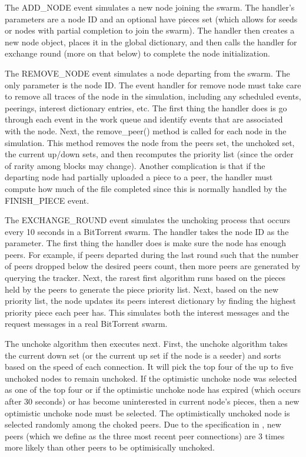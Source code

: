 The ADD\_NODE event simulates a new node joining the swarm. The handler's
parameters are a node ID and an optional have pieces set (which allows for
seeds or nodes with partial completion to join the swarm). The handler
then creates a new node object, places it in the global dictionary,
and then calls the handler for exchange round (more on that below)
to complete the node initialization.

The REMOVE\_NODE event simulates a node departing from the swarm. The 
only parameter is the node ID. The event handler for remove node must
take care to remove all traces of the node in the simulation, including
any scheduled events, peerings, interest dictionary entries, etc. The first
thing the handler does is go through each event in the work queue and identify
events that are associated with the node. Next, the remove\_peer() method is called
for each node in the simulation. This method removes the node from the peers set,
the unchoked set, the current up/down sets, and then recomputes the priority list (since
the order of rarity among blocks may change). Another complication is that if the 
departing node had partially uploaded a piece to a peer, the handler must compute
how much of the file completed since this is normally handled by the FINISH\_PIECE event.

The EXCHANGE\_ROUND event simulates the unchoking process that occurs every 10 seconds
in a BitTorrent swarm. The handler takes the node ID as the parameter. The first thing the 
handler does is make sure the node has enough
peers. For example, if peers departed during the last round such that the number of peers
dropped below the desired peers count, then more peers are generated by querying the tracker.
Next, the rarest first algorithm runs based on the pieces held by the peers to generate the
piece priority list. Next, based on the new priority list, the node updates its peers interest
dictionary by finding the highest priority piece each peer has. This simulates both the interest
messages and the request messages in a real BitTorrent swarm. 

The unchoke algorithm then executes next. First, the unchoke algorithm takes the current down set
(or the current up set if the node is a seeder) and sorts based on the speed of each connection.
It will pick the top four of the up to five unchoked nodes to remain unchoked. If the optimistic
unchoke node was selected as one of the top four or if the optimistic unchoke node has expired (which
occurs after 30 seconds) or has become uninterested in current node's pieces, then a new optimistic 
unchoke node must be selected. The optimistically unchoked node is selected randomly among the 
choked peers. Due to the specification in \cite{bep003}, new peers (which we define as the three most
recent peer connections) are 3 times more likely than other peers to be optimisically unchoked.

